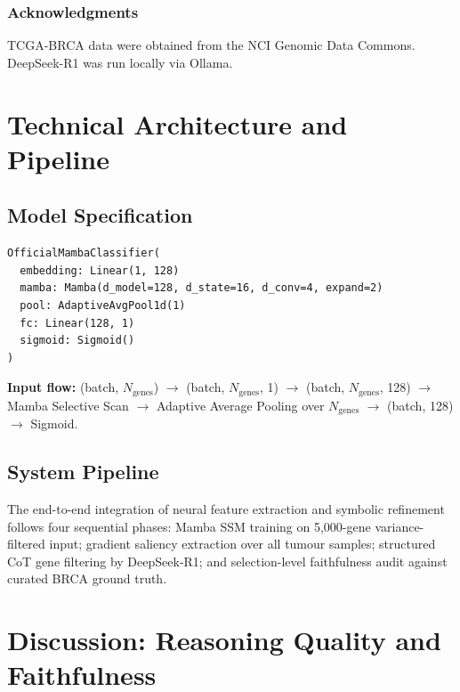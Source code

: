 \documentclass{article}
\begin{document}
\subsubsection*{Acknowledgments}
TCGA-BRCA data were obtained from the NCI Genomic Data Commons.
DeepSeek-R1 was run locally via Ollama.




\newpage
\appendix

\section{Technical Architecture and Pipeline}
\label{app:arch}

\subsection{Model Specification}
\begin{verbatim}
OfficialMambaClassifier(
  embedding: Linear(1, 128)
  mamba: Mamba(d_model=128, d_state=16, d_conv=4, expand=2)
  pool: AdaptiveAvgPool1d(1)
  fc: Linear(128, 1)
  sigmoid: Sigmoid()
)
\end{verbatim}
\textbf{Input flow:} (batch, $N_\text{genes}$) $\to$ (batch, $N_\text{genes}$, 1)
$\to$ (batch, $N_\text{genes}$, 128) $\to$ Mamba Selective Scan $\to$
Adaptive Average Pooling over $N_\text{genes}$ $\to$ (batch, 128) $\to$ Sigmoid.

\subsection{System Pipeline}
The end-to-end integration of neural feature extraction and symbolic
refinement follows four sequential phases: Mamba SSM training on
5,000-gene variance-filtered input; gradient saliency extraction over all
tumour samples; structured CoT gene filtering by DeepSeek-R1; and
selection-level faithfulness audit against curated BRCA ground truth.

\section{Discussion: Reasoning Quality and Faithfulness}
\label{sec:discussion}
\end{document}
